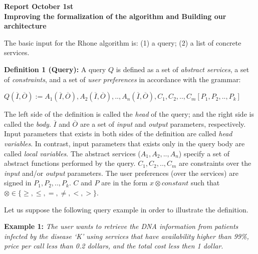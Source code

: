 \documentclass[12pt,a4paper,oneside]{article}
\begin{document}
\begin{center}
\textbf{\large{Report October 1st}} \\
\textbf{Improving the formalization of the algorithm and Building our architecture}
\end{center}

The basic input for the Rhone algorithm is: (1) a query; (2) a list of concrete services.

\noindent \textbf{Definition 1 (Query):} 
A query $Q$ is defined as a set of \textit{abstract services}, a set of \textit{constraints}, and a set of \textit{user preferences} in accordance with the grammar: 
\begin{center}
$Q (\overline{I}, \overline{O}) := A_{1}(\overline{I}, \overline{O}), A_{2}(\overline{I}, \overline{O}), ..,  A_{n}(\overline{I}, \overline{O}),C_{1},C_{2}, .., C_{m}[P_{1},P_{2}, .., P_{k}]$
\end{center}  
The left side of the definition is called the \textit{head} of the query; and the right side is called the \textit{body}. 
$\overline{I}$ and $\overline{O}$ are a set of \textit{input} and \textit{output} parameters, respectively.
Input parameters that exists in both sides of the definition are called \textit{head variables}.
In contrast, input parameters that exists only in the query body are called \textit{local variables}.
The abstract services ($A_{1}, A_{2}, .., A_{n}$) specify a set of abstract functions performed by the query.
$C_{1}, C_{2}, .., C_{m}$ are constraints over the \textit{input} and/or \textit{output} parameters.
The user preferences (over the services) are signed in $P_{1}, P_{2}, .., P_{k}$. $C$ and $P$ are in the form $x \otimes constant$ such that $\otimes \in\lbrace \geq, \leq, =, \neq, <, >\rbrace$.

Let us suppose the following query example in order to illustrate the definition.

\noindent \textbf{Example 1:} %
\textit{The user wants to retrieve the DNA information from patients infected by the disease `K' using services that have availability higher than 99\%, price per call less than 0.2 dollars, and the total cost less then 1 dollar}.
\end{document}
